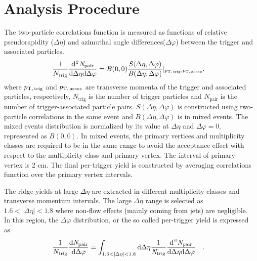\section{Analysis Procedure}
\label{sec:ana}

The two-particle correlations function is measured as functions of relative pseudorapidity ($\Delta\eta$) and azimuthal angle differences($\Delta\varphi$) between the trigger and associated particles.
\begin{eqnarray}
\frac{1}{N_{\rm{trig}}} \frac{ \rm{d}\it{}^{2} N_{\rm{pair}} }{ \rm{d} \Delta\eta \rm{d}\Delta\varphi} = B(0, 0)\frac{S(\Delta\eta, \Delta\varphi)}{B(\Delta\eta, \Delta\varphi)} \lvert_{p_\mathrm{T,\,trig},p_\mathrm{T,\,assoc}}  , 
\label{eq:corrfunction}
\end{eqnarray}
where  $p_\mathrm{T,\,trig}$ and $p_\mathrm{T,\,assoc}$ are transverse momenta of the trigger and associated particles, respectively, $N_\mathrm{trig}$ is the number of trigger particles and $N_\mathrm{pair}$ is the number of trigger-associated particle pairs. $S (\Delta\eta, \Delta\varphi)$ is constructed using two-particle correlations in the same event and $B(\Delta\eta, \Delta\varphi)$ is in mixed events. The mixed events distribution is normalized by its value at $\Delta\eta$ and $\Delta\varphi = 0$, represented as $B (0,0)$. In mixed events, the primary vertices and multiplicity classes are required to be in the same range to avoid the acceptance effect with respect to the multiplicity class and primary vertex. The interval of primary vertex is 2 cm. The final per-trigger yield is constructed by averaging correlations function over the primary vertex intervals.

The ridge yields at large $\Delta\eta$ are extracted in different multiplicity classes and transverse momentum intervals. The large $\Delta\eta$ range is selected as $1.6<|\Delta\eta|<1.8$ where non-flow effects (mainly coming from jets) are negligible. In this region, the $\Delta\varphi$ distribution, or the so called per-trigger yield is expressed as
\begin{eqnarray}
\frac{1}{N_{\rm{trig}}} \frac{ \rm{d}\it{}N_{\rm{pair}} }{ \rm{d}\Delta\varphi } = \int_{1.6<|\Delta \eta|<1.8} \rm{d} \Delta \eta \frac{1}{\it{N}_{\rm{trig}}} \frac{ \rm{d}\it{}^{2} N_{\rm{pair}} }{ \rm{d}\Delta\eta d\Delta\varphi} \quad.
\end{eqnarray}

